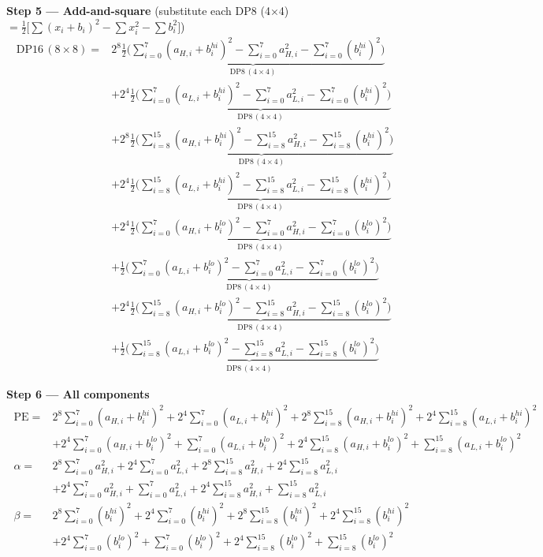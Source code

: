 \documentclass[fleqn]{article}
\newcommand{\DPop}[3]{\mathrm{DP#1}\,(#2\!\times\!#3)}
\begin{document}
\textbf{Step 5 --- Add-and-square}\quad
{\small(substitute each DP8 (4$\times$4) $= \tfrac{1}{2}\big[\sum(x_i{+}b_i)^2 - \sum x_i^2 - \sum b_i^2\big]$)}
\begin{align*}
\DPop{16}{8}{8} = {}
  & 2^{8}\underbrace{\tfrac{1}{2}\Big(\sum_{i=0}^{7}(a_{H,i}{+}b_i^{hi})^2 - \sum_{i=0}^{7}a_{H,i}^2 - \sum_{i=0}^{7}(b_i^{hi})^2\Big)}_{\DPop{8}{4}{4}} \\[0.7em]
  & + 2^{4}\underbrace{\tfrac{1}{2}\Big(\sum_{i=0}^{7}(a_{L,i}{+}b_i^{hi})^2 - \sum_{i=0}^{7}a_{L,i}^2 - \sum_{i=0}^{7}(b_i^{hi})^2\Big)}_{\DPop{8}{4}{4}} \\[0.7em]
  & + 2^{8}\underbrace{\tfrac{1}{2}\Big(\sum_{i=8}^{15}(a_{H,i}{+}b_i^{hi})^2 - \sum_{i=8}^{15}a_{H,i}^2 - \sum_{i=8}^{15}(b_i^{hi})^2\Big)}_{\DPop{8}{4}{4}} \\[0.7em]
  & + 2^{4}\underbrace{\tfrac{1}{2}\Big(\sum_{i=8}^{15}(a_{L,i}{+}b_i^{hi})^2 - \sum_{i=8}^{15}a_{L,i}^2 - \sum_{i=8}^{15}(b_i^{hi})^2\Big)}_{\DPop{8}{4}{4}} \\[0.7em]
  & + 2^{4}\underbrace{\tfrac{1}{2}\Big(\sum_{i=0}^{7}(a_{H,i}{+}b_i^{lo})^2 - \sum_{i=0}^{7}a_{H,i}^2 - \sum_{i=0}^{7}(b_i^{lo})^2\Big)}_{\DPop{8}{4}{4}} \\[0.7em]
  & + \underbrace{\tfrac{1}{2}\Big(\sum_{i=0}^{7}(a_{L,i}{+}b_i^{lo})^2 - \sum_{i=0}^{7}a_{L,i}^2 - \sum_{i=0}^{7}(b_i^{lo})^2\Big)}_{\DPop{8}{4}{4}} \\[0.7em]
  & + 2^{4}\underbrace{\tfrac{1}{2}\Big(\sum_{i=8}^{15}(a_{H,i}{+}b_i^{lo})^2 - \sum_{i=8}^{15}a_{H,i}^2 - \sum_{i=8}^{15}(b_i^{lo})^2\Big)}_{\DPop{8}{4}{4}} \\[0.7em]
  & + \underbrace{\tfrac{1}{2}\Big(\sum_{i=8}^{15}(a_{L,i}{+}b_i^{lo})^2 - \sum_{i=8}^{15}a_{L,i}^2 - \sum_{i=8}^{15}(b_i^{lo})^2\Big)}_{\DPop{8}{4}{4}}
\end{align*}

\textbf{Step 6 --- All components}
\[
\boxed{\;
\begin{aligned}
\mathrm{PE} ={}& 2^{8}\sum_{i=0}^{7}(a_{H,i}{+}b_i^{hi})^2 + 2^{4}\sum_{i=0}^{7}(a_{L,i}{+}b_i^{hi})^2 + 2^{8}\sum_{i=8}^{15}(a_{H,i}{+}b_i^{hi})^2 + 2^{4}\sum_{i=8}^{15}(a_{L,i}{+}b_i^{hi})^2 \\
  & + 2^{4}\sum_{i=0}^{7}(a_{H,i}{+}b_i^{lo})^2 + \sum_{i=0}^{7}(a_{L,i}{+}b_i^{lo})^2 + 2^{4}\sum_{i=8}^{15}(a_{H,i}{+}b_i^{lo})^2 + \sum_{i=8}^{15}(a_{L,i}{+}b_i^{lo})^2 \\[0.6em]
\alpha ={}& 2^{8}\sum_{i=0}^{7}a_{H,i}^2 + 2^{4}\sum_{i=0}^{7}a_{L,i}^2 + 2^{8}\sum_{i=8}^{15}a_{H,i}^2 + 2^{4}\sum_{i=8}^{15}a_{L,i}^2 \\
  & + 2^{4}\sum_{i=0}^{7}a_{H,i}^2 + \sum_{i=0}^{7}a_{L,i}^2 + 2^{4}\sum_{i=8}^{15}a_{H,i}^2 + \sum_{i=8}^{15}a_{L,i}^2 \\[0.6em]
\beta ={}& 2^{8}\sum_{i=0}^{7}(b_i^{hi})^2 + 2^{4}\sum_{i=0}^{7}(b_i^{hi})^2 + 2^{8}\sum_{i=8}^{15}(b_i^{hi})^2 + 2^{4}\sum_{i=8}^{15}(b_i^{hi})^2 \\
  & + 2^{4}\sum_{i=0}^{7}(b_i^{lo})^2 + \sum_{i=0}^{7}(b_i^{lo})^2 + 2^{4}\sum_{i=8}^{15}(b_i^{lo})^2 + \sum_{i=8}^{15}(b_i^{lo})^2
\end{aligned}
\;}
\]
\end{document}
